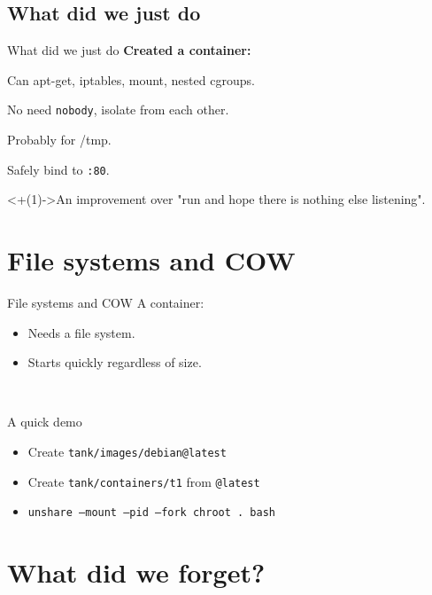 \documentclass[14pt]{beamer}
\begin{document}
\subsection{What did we just do}
\begin{frame}{What did we just do}
    \relax
    {\bf Created a container:}
    \begin{description}[<+(1)->]
        \item[Fake root] Can apt-get, iptables, mount, nested cgroups.
        \item[Isolated pids] No need {\tt nobody}, isolate from each other.
        \item[Isolated mounts] Probably for /tmp.
        \item[Isolated network] Safely bind to {\tt :80}.
    \end{description}
    \onslide<+(1)->{An improvement over "run and hope there is nothing else listening".}
\end{frame}

\section{File systems and COW}
\begin{frame}{File systems and COW}
    A container:
    \begin{itemize}[<+->]
        \item Needs a file system.
        \item Starts quickly regardless of size.
    \end{itemize}
     \\
\end{frame}

\begin{frame}{A quick demo}
    \small
    \begin{itemize}
        \item Create {\tt tank/images/debian@latest}
        \item Create {\tt tank/containers/t1} from {\tt @latest}
        \item {\tt unshare --mount --pid --fork chroot . bash}
    \end{itemize}
\end{frame}

\section{What did we forget?}
\end{document}
